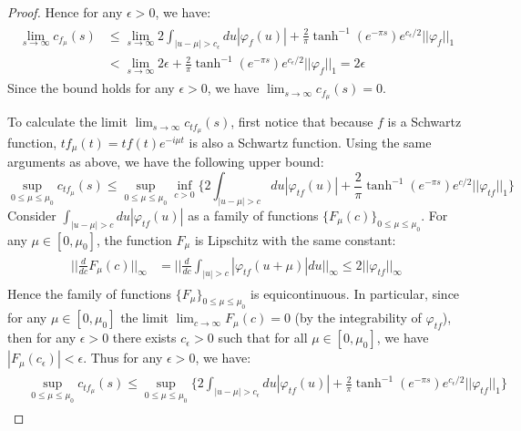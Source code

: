 \documentclass[a4paper,11pt]{article}
\theoremstyle{definition}
\begin{document}
\begin{proof}
    Hence for any $\epsilon > 0$, we have:
    \begin{align}
        \begin{split}
            \lim_{s\rightarrow\infty}c_{f_\mu}(s) &\leq \lim_{s\rightarrow\infty}2\int_{|u-\mu|>c_\epsilon}du|\varphi_f(u)| + \frac{2}{\pi}\tanh^{-1}(e^{-\pi s})e^{c_\epsilon/2}||\varphi_f||_1
            \\&
            <\lim_{s\rightarrow\infty}2\epsilon + \frac{2}{\pi}\tanh^{-1}(e^{-\pi s})e^{c_\epsilon/2}||\varphi_f||_1 = 2\epsilon
        \end{split}
    \end{align}
    Since the bound holds for any $\epsilon > 0$, we have $\lim_{s\rightarrow\infty}c_{f_\mu}(s) = 0$.

    To calculate the limit $\lim_{s\rightarrow\infty}c_{tf_\mu}(s)$, first notice that because $f$ is a Schwartz function, $tf_\mu(t) = tf(t)e^{-i\mu t}$ is also a Schwartz function. Using the same arguments as above, we have the following upper bound:
    \begin{equation}
        \sup_{0\leq \mu\leq\mu_0}c_{tf_\mu}(s) \leq \sup_{0\leq \mu\leq\mu_0}\inf_{c > 0}\{2\int_{|u - \mu| > c}du|\varphi_{tf}(u)|+ \frac{2}{\pi}\tanh^{-1}(e^{-\pi s})e^{c/2}||\varphi_{tf}||_1\}
    \end{equation}
    Consider $\int_{|u-\mu| > c}du|\varphi_{tf}(u)|$ as a family of functions $\{F_\mu(c)\}_{0\leq\mu\leq\mu_0}$. For any $\mu \in [0, \mu_0]$, the function $F_\mu$ is Lipschitz with the same constant:
    \begin{align}
        \begin{split}
            ||\frac{d}{dc}F_\mu(c)||_\infty &= ||\frac{d}{dc}\int_{|u| > c}|\varphi_{tf}(u + \mu)|du||_\infty \leq 2||\varphi_{tf}||_\infty
        \end{split}
    \end{align}
    Hence the family of functions $\{F_\mu\}_{0\leq \mu\leq \mu_0}$ is equicontinuous. In particular, since for any $\mu\in [0, \mu_0]$ the limit $\lim_{c\rightarrow \infty}F_\mu(c) = 0$ (by the integrability of $\varphi_{tf}$), then for any $\epsilon > 0$ there exists $c_\epsilon > 0$ such that for all $\mu \in [0, \mu_0]$, we have $|F_\mu(c_\epsilon)| < \epsilon$. Thus for any $\epsilon > 0$, we have:
    \begin{align}
        \begin{split}
            &\sup_{0\leq \mu\leq \mu_0}c_{tf_\mu}(s) \leq \sup_{0\leq \mu\leq\mu_0}\{2\int_{|u - \mu| > c_\epsilon} du |\varphi_{tf}(u)| + \frac{2}{\pi}\tanh^{-1}(e^{-\pi s})e^{c_\epsilon / 2}||\varphi_{tf}||_1\}

\end{split}
\end{align}
\end{proof}
\end{document}
